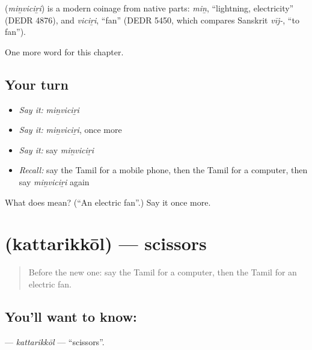\begin{cousinweb}
\textbf{} (\emph{miṉviciṟi}) is a modern coinage from native parts: \emph{miṉ}, \textquotedblleft{}lightning, electricity\textquotedblright{} (DEDR 4876), and \emph{viciṟi}, \textquotedblleft{}fan\textquotedblright{} (DEDR 5450, which compares Sanskrit \emph{vīj-}, \textquotedblleft{}to fan\textquotedblright{}).
\end{cousinweb}

\begin{grammarlens}[title={What you've built}]
One more word for this chapter.
\end{grammarlens}

\subsection*{Your turn}
\begin{itemize}
\raggedright
  \item \emph{Say it:} \emph{miṉviciṟi}
  \item \emph{Say it:} \emph{miṉviciṟi}, once more
  \item \emph{Say it:} say \emph{miṉviciṟi}
  \item \emph{Recall:} say the Tamil for a mobile phone, then the Tamil for a computer, then say \emph{miṉviciṟi} again
\end{itemize}

\begin{tcolorbox}[breakable,colback=teal!4,colframe=teal!35!black,title={Before you move on}]
What does  mean? (\textquotedblleft{}An electric fan\textquotedblright{}.) Say it once more.
\end{tcolorbox}
\section[\texorpdfstring{\ta{கத்தரிக்கோல்} (kattarikkōl)}{கத்தரிக்கோல் (kattarikkōl)}]{ (kattarikkōl) — scissors}

\label{lesson:TA-C135-kattarikkol}



\begin{quote}
Before the new one: say the Tamil for a computer, then the Tamil for an electric fan.
\end{quote}

\subsection*{You'll want to know: }
\textbf{} — \emph{kattarikkōl} — \textquotedblleft{}scissors\textquotedblright{}.

